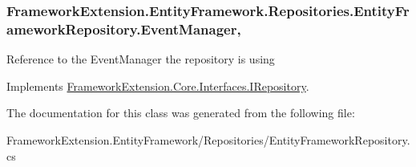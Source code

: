 \hypertarget{class_framework_extension_1_1_entity_framework_1_1_repositories_1_1_entity_framework_repository_ab8e957acbf4423a277ba2adb60eb6815}{
\subsubsection[{Event\-Manager}]{ Framework\-Extension.\-Entity\-Framework.\-Repositories.\-Entity\-Framework\-Repository.\-Event\-Manager\hspace{0.3cm}{\ttfamily [get]}, {\ttfamily [set]}}}\label{class_framework_extension_1_1_entity_framework_1_1_repositories_1_1_entity_framework_repository_ab8e957acbf4423a277ba2adb60eb6815}


Reference to the Event\-Manager the repository is using 



Implements \hyperlink{interface_framework_extension_1_1_core_1_1_interfaces_1_1_i_repository}{Framework\-Extension.\-Core.\-Interfaces.\-I\-Repository}.



The documentation for this class was generated from the following file\-:\begin{DoxyCompactItemize}
\item 
Framework\-Extension.\-Entity\-Framework/\-Repositories/Entity\-Framework\-Repository.\-cs\end{DoxyCompactItemize}

